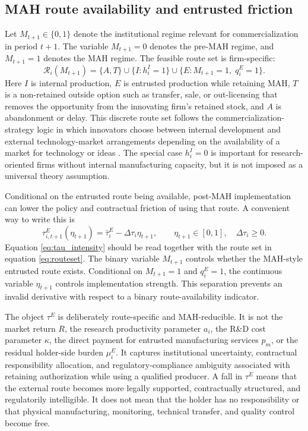 \documentclass[12pt]{article}
\newcommand{\1}{\mathbf{1}}
\newcommand{\calR}{\mathcal{R}}
\begin{document}
\subsection{MAH route availability and entrusted friction}

Let $M_{t+1}\in\{0,1\}$ denote the institutional regime relevant for commercialization in period $t+1$. The variable $M_{t+1}=0$ denotes the pre-MAH regime, and $M_{t+1}=1$ denotes the MAH regime. The feasible route set is firm-specific:
\begin{equation}
    \calR_i(M_{t+1})
    =
    \{A,T\}
    \cup \{I:h_i^I=1\}
    \cup \{E:M_{t+1}=1,\;q_i^E=1\}.
    \label{eq:routeset}
\end{equation}
Here $I$ is internal production, $E$ is entrusted production while retaining MAH, $T$ is a non-retained outside option such as transfer, sale, or out-licensing that removes the opportunity from the innovating firm's retained stock, and $A$ is abandonment or delay. This discrete route set follows the commercialization-strategy logic in which innovators choose between internal development and external technology-market arrangements depending on the availability of a market for technology or ideas \citep{AroraFosfuriGambardella2001,GansStern2003}. The special case $h_i^I=0$ is important for research-oriented firms without internal manufacturing capacity, but it is not imposed as a universal theory assumption.

Conditional on the entrusted route being available, post-MAH implementation can lower the policy and contractual friction of using that route. A convenient way to write this is
\begin{equation}
    \tau^E_{i,t+1}(\eta_{t+1})
    =\bar\tau_i^E-\Delta\tau_i\eta_{t+1},
    \qquad \eta_{t+1}\in[0,1],\quad \Delta\tau_i\ge0.
    \label{eq:tau_intensity}
\end{equation}
Equation \eqref{eq:tau_intensity} should be read together with the route set in equation \eqref{eq:routeset}. The binary variable $M_{t+1}$ controls whether the MAH-style entrusted route exists. Conditional on $M_{t+1}=1$ and $q_i^E=1$, the continuous variable $\eta_{t+1}$ controls implementation strength. This separation prevents an invalid derivative with respect to a binary route-availability indicator.

The object $\tau^E$ is deliberately route-specific and MAH-reducible. It is not the market return $R$, the research productivity parameter $a_i$, the R\&D cost parameter $\kappa$, the direct payment for entrusted manufacturing services $p_m$, or the residual holder-side burden $\mu_i^E$. It captures institutional uncertainty, contractual responsibility allocation, and regulatory-compliance ambiguity associated with retaining authorization while using a qualified producer. A fall in $\tau^E$ means that the external route becomes more legally supported, contractually structured, and regulatorily intelligible. It does not mean that the holder has no responsibility or that physical manufacturing, monitoring, technical transfer, and quality control become free.
\end{document}
